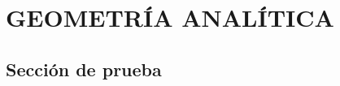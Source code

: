 \chapter[Geometría Analítica]{GEOMETRÍA ANALÍTICA}%
\startcontents
\printchaptertableofcontents

\lipsum[1-3]
\section{Sección de prueba}
\lipsum[1-5]